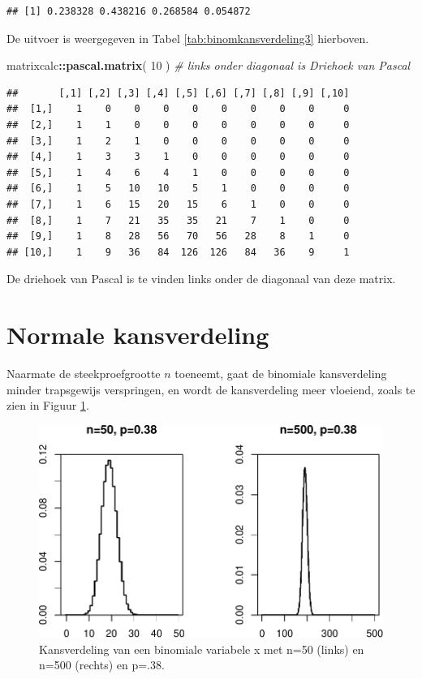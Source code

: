 \documentclass[
]{book}
\newenvironment{Shaded}{\begin{snugshade}}{\end{snugshade}}
\newcommand{\CommentTok}[1]{\textcolor[rgb]{0.56,0.35,0.01}{\textit{#1}}}
\newcommand{\DecValTok}[1]{\textcolor[rgb]{0.00,0.00,0.81}{#1}}
\newcommand{\KeywordTok}[1]{\textcolor[rgb]{0.13,0.29,0.53}{\textbf{#1}}}
\newcommand{\NormalTok}[1]{#1}
\newcommand{\OperatorTok}[1]{\textcolor[rgb]{0.81,0.36,0.00}{\textbf{#1}}}
\begin{document}
\begin{verbatim}
## [1] 0.238328 0.438216 0.268584 0.054872
\end{verbatim}

De uitvoer is weergegeven in Tabel \ref{tab:binomkansverdeling3} hierboven.

\begin{Shaded}
\begin{Highlighting}[]
\NormalTok{matrixcalc}\OperatorTok{::}\KeywordTok{pascal.matrix}\NormalTok{( }\DecValTok{10}\NormalTok{ ) }\CommentTok{\# links onder diagonaal is Driehoek van Pascal}
\end{Highlighting}
\end{Shaded}

\begin{verbatim}
##       [,1] [,2] [,3] [,4] [,5] [,6] [,7] [,8] [,9] [,10]
##  [1,]    1    0    0    0    0    0    0    0    0     0
##  [2,]    1    1    0    0    0    0    0    0    0     0
##  [3,]    1    2    1    0    0    0    0    0    0     0
##  [4,]    1    3    3    1    0    0    0    0    0     0
##  [5,]    1    4    6    4    1    0    0    0    0     0
##  [6,]    1    5   10   10    5    1    0    0    0     0
##  [7,]    1    6   15   20   15    6    1    0    0     0
##  [8,]    1    7   21   35   35   21    7    1    0     0
##  [9,]    1    8   28   56   70   56   28    8    1     0
## [10,]    1    9   36   84  126  126   84   36    9     1
\end{verbatim}

De driehoek van Pascal is te vinden links onder de diagonaal van deze matrix.

\hypertarget{sec:normaalverdeling}{%
\section{Normale kansverdeling}\label{sec:normaalverdeling}}

Naarmate de steekproefgrootte \(n\) toeneemt, gaat de binomiale
kansverdeling minder trapsgewijs verspringen, en wordt de kansverdeling
meer vloeiend, zoals te zien in
Figuur \ref{fig:binomkansverdeling50n500}.

\begin{figure}
\centering
\includegraphics{MS1NL-boek_files/figure-latex/binomkansverdeling50n500-1.pdf}
\caption{\label{fig:binomkansverdeling50n500}Kansverdeling van een binomiale variabele x met n=50 (links) en n=500 (rechts) en p=.38.}
\end{figure}
\end{document}

